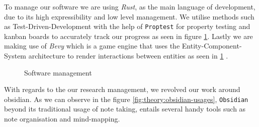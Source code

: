 To manage our software we are using \textit{Rust},
as the main language of development, due to its high expressibility and low level management.
We utilise methods such as Test-Driven-Development with the help of \texttt{Proptest}
for property testing and kanban boards to accurately track our progress as seen
in figure \ref{fig:soft:ecs-workflow}. Lastly we are making use of 
\textit{Bevy} which is a game engine that uses the Entity-Component-System
architecture to render interactions between entities as seen in \ref{fig:soft:ecs-workflow} \cite{bevyengine}.


\begin{figure}[h!]
    \centering
    \hfill
    \caption{Software management}
    \label{fig:soft:ecs-workflow}
\end{figure}

With regards to the our research management, we revolved our work around obsidian.
As we can observe in the figure \ref{fig:theory:obsidian-usages}, 
\texttt{Obsidian} beyond its traditional usage of note taking, entails several handy tools such as note organisation and mind-mapping.



